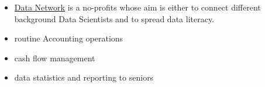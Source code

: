 \documentclass[10pt,a4paper,ragged2e]{altacv}
\begin{document}
{}
\begin{itemize}
\item \href{https://datanetwork.xyz/}{Data Network} is a no-profits whose aim is either to connect different background Data Scientists and to spread data literacy.
\end{itemize}

\divider

\begin{itemize}
\item routine Accounting operations
\smallskip
\item cash flow management
\smallskip
\item data statistics and reporting to seniors
\end{itemize}

\divider

\begin{itemize}

\end{itemize}

{}
{}



\end{document}

